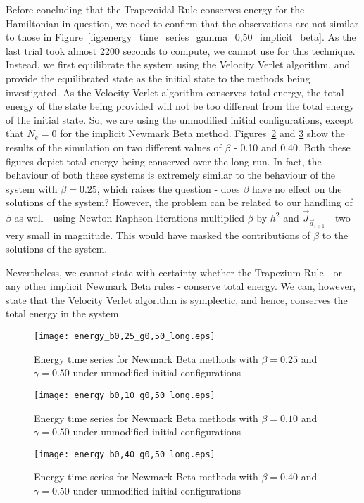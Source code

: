 \documentclass[../Main.tex]{subfiles}
\begin{document}
Before concluding that the Trapezoidal Rule conserves energy for the Hamiltonian in question, we need to confirm that the observations are not similar to those in Figure~\ref{fig:energy_time_series_gamma_0,50_implicit_beta}. As the last trial took almost 2200 seconds to compute, we cannot use for this technique. Instead, we first equilibrate the system using the Velocity Verlet algorithm, and provide the equilibrated state as the initial state to the methods being investigated. As the Velocity Verlet algorithm conserves total energy, the total energy of the state being provided will not be too different from the total energy of the initial state. So, we are using the unmodified initial configurations, except that $N_{e} = 0$ for the implicit Newmark Beta method. Figures~\ref{fig:energy_time_series_beta_0,10_gamma_0,50_long} and \ref{fig:energy_time_series_beta_0,40_gamma_0,50_long} show the results of the simulation on two different values of $\beta$ - 0.10 and 0.40. Both these figures depict total energy being conserved over the long run. In fact, the behaviour of both these systems is extremely similar to the behaviour of the system with $\beta = 0.25$, which raises the question - does $\beta$ have no effect on the solutions of the system? However, the problem can be related to our handling of $\beta$ as well - using Newton-Raphson Iterations multiplied $\beta$ by $h^{2}$ and $\vec{J}_{\vec{a}_{i+1}}$ - two very small in magnitude. This would have masked the contributions of $\beta$ to the solutions of the system.

Nevertheless, we cannot state with certainty whether the Trapezium Rule - or any other implicit Newmark Beta rules - conserve total energy. We can, however, state that the Velocity Verlet algorithm is symplectic, and hence, conserves the total energy in the system. 
\begin{figure}[H]
\centering
\texttt{[image: energy\_b0,25\_g0,50\_long.eps]}
\caption{Energy time series for Newmark Beta methods with $\beta = 0.25$  and $\gamma = 0.50$ under unmodified initial configurations}
\label{fig:energy_time_series_beta_0,25_gamma_0,50_long}
\end{figure}

\begin{figure}[H]
\centering
\texttt{[image: energy\_b0,10\_g0,50\_long.eps]}
\caption{Energy time series for Newmark Beta methods with $\beta = 0.10$  and $\gamma = 0.50$ under unmodified initial configurations}
\label{fig:energy_time_series_beta_0,10_gamma_0,50_long}
\end{figure}

\begin{figure}[H]
\centering
\texttt{[image: energy\_b0,40\_g0,50\_long.eps]}
\caption{Energy time series for Newmark Beta methods with $\beta = 0.40$  and $\gamma = 0.50$ under unmodified initial configurations}
\label{fig:energy_time_series_beta_0,40_gamma_0,50_long}
\end{figure}
\centering
\end{document}

